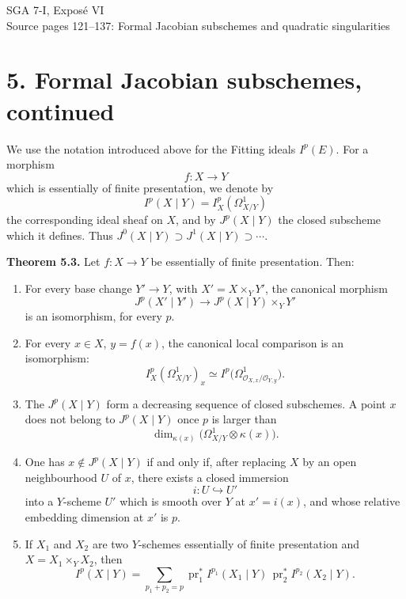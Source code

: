 \documentclass[11pt]{article}
\providecommand{\pr}{\operatorname{pr}}
\providecommand{\Oo}{\mathcal O}
\begin{document}
\begin{center}
{\Large SGA 7-I, Exposé VI}\\[0.35em]
{\large Source pages 121--137: Formal Jacobian subschemes and quadratic singularities}
\end{center}

\section*{5. Formal Jacobian subschemes, continued}

We use the notation introduced above for the Fitting ideals \(I^p(E)\).  For a morphism
\[
        f:X\longrightarrow Y
\]
which is essentially of finite presentation, we denote by
\[
        I^p(X\mid Y)=I^p_X(\Omega^1_{X/Y})
\]
the corresponding ideal sheaf on \(X\), and by \(J^p(X\mid Y)\) the closed subscheme which it defines.  Thus \(J^0(X\mid Y)\supset J^1(X\mid Y)\supset\cdots\).

\textbf{Theorem 5.3.}  Let \(f:X\to Y\) be essentially of finite presentation.  Then:
\begin{enumerate}[label=(\arabic*)]
\item For every base change \(Y'\to Y\), with \(X'=X\times_Y Y'\), the canonical morphism
\[
        J^p(X'\mid Y')\longrightarrow J^p(X\mid Y)\times_Y Y'
\]
is an isomorphism, for every \(p\).
\item For every \(x\in X\), \(y=f(x)\), the canonical local comparison is an isomorphism:
\[
        I^p_X(\Omega^1_{X/Y})_x
        \simeq
        I^p\bigl(\Omega^1_{\Oo_{X,x}/\Oo_{Y,y}}\bigr).
\]
\item The \(J^p(X\mid Y)\) form a decreasing sequence of closed subschemes.  A point \(x\) does not belong to \(J^p(X\mid Y)\) once \(p\) is larger than
\[
        \dim_{\kappa(x)}\bigl(\Omega^1_{X/Y}\otimes\kappa(x)\bigr).
\]
\item One has \(x\notin J^p(X\mid Y)\) if and only if, after replacing \(X\) by an open neighbourhood \(U\) of \(x\), there exists a closed immersion
\[
        i:U\hookrightarrow U'
\]
into a \(Y\)-scheme \(U'\) which is smooth over \(Y\) at \(x'=i(x)\), and whose relative embedding dimension at \(x'\) is \(p\).
\item If \(X_1\) and \(X_2\) are two \(Y\)-schemes essentially of finite presentation and \(X=X_1\times_YX_2\), then
\[
        I^p(X\mid Y)
        =
        \sum_{p_1+p_2=p}
        \pr_1^*I^{p_1}(X_1\mid Y)\,
        \pr_2^*I^{p_2}(X_2\mid Y).
\]
\end{enumerate}
\end{document}
